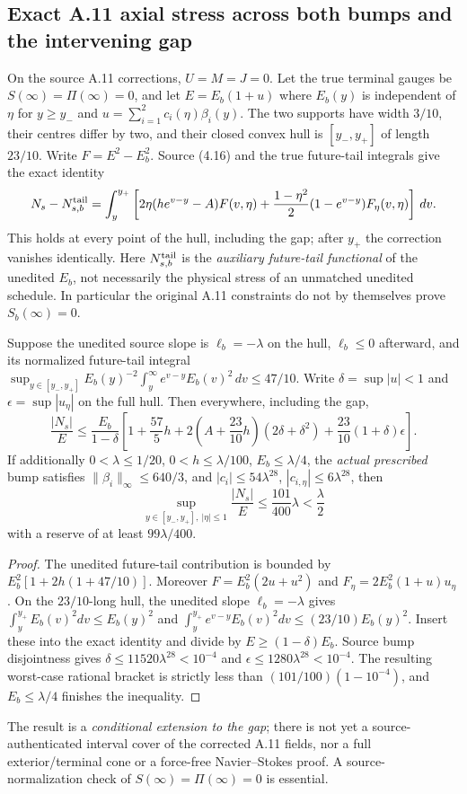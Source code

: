 \subsection*{Exact A.11 axial stress across both bumps and the intervening gap}
\label{subsec:a11-full-hull-20261021}
On the source A.11 corrections, $U=M=J=0$. Let the true terminal
gauges be $S(\infty)=\Pi(\infty)=0$, and let
$E=E_b(1+u)$ where $E_b(y)$ is independent of $\eta$ for
$y\ge y_-$ and $u=\sum_{i=1}^2c_i(\eta)\beta_i(y)$.
The two supports have width $3/10$, their centres differ by
two, and their closed convex hull is $[y_-,y_+]$ of length $23/10$.
Write $F=E^2-E_b^2$. Source (4.16) and the true future-tail
integrals give the exact identity
\[
N_s-N_{s,b}^{\rm tail}
=\int_y^{y_+}\left[
 2\eta(he^{v-y}-A)F(v,\eta)
 +\frac{1-\eta^2}{2}(1-e^{v-y})F_\eta(v,\eta)
\right]\,dv .
\]
This holds at every point of the hull, including the gap; after
$y_+$ the correction vanishes identically. Here $N_{s,b}^{\rm tail}$
is the \emph{auxiliary future-tail functional} of the unedited
$E_b$, not necessarily the physical stress of an unmatched
unedited schedule. In particular the original A.11 constraints
do not by themselves prove $S_b(\infty)=0$.

\begin{proposition}
\label{prop:a11-full-hull-20261021}
Suppose the unedited source slope is $\ell_b=-\lambda$ on the
hull, $\ell_b\le0$ afterward, and its normalized future-tail
integral $\sup_{y\in[y_-,y_+]}E_b(y)^{-2}
\int_y^\infty e^{v-y}E_b(v)^2\,dv\le47/10$.
Write $\delta=\sup|u|<1$ and $\epsilon=\sup|u_\eta|$ on the
full hull. Then everywhere, including the gap,
\[
\frac{|N_s|}{E}\le\frac{E_b}{1-\delta}
\left[1+\frac{57}{5}h+
2\left(A+\frac{23}{10}h\right)(2\delta+\delta^2)
+\frac{23}{10}(1+\delta)\epsilon\right].
\]
If additionally $0<\lambda\le1/20$, $0<h\le\lambda/100$,
$E_b\le\lambda/4$, the \emph{actual prescribed} bump
satisfies $\|\beta_i\|_\infty\le640/3$, and
$|c_i|\le54\lambda^{28}$, $|c_{i,\eta}|\le6\lambda^{28}$,
then
\[
\sup_{y\in[y_-,y_+],\ |\eta|\le1}\frac{|N_s|}{E}
\le\frac{101}{400}\lambda<\frac{\lambda}{2}
\]
with a reserve of at least $99\lambda/400$.
\end{proposition}
\begin{proof}
The unedited future-tail contribution is bounded by
$E_b^2[1+2h(1+47/10)]$. Moreover
$F=E_b^2(2u+u^2)$ and
$F_\eta=2E_b^2(1+u)u_\eta$.
On the $23/10$-long hull, the unedited slope
$\ell_b=-\lambda$ gives
$\int_y^{y_+}E_b(v)^2dv\le E_b(y)^2$ and
$\int_y^{y_+}e^{v-y}E_b(v)^2dv\le(23/10)E_b(y)^2$.
Insert these into the exact identity and divide by
$E\ge(1-\delta)E_b$. Source bump disjointness gives
$\delta\le11520\lambda^{28}<10^{-4}$ and
$\epsilon\le1280\lambda^{28}<10^{-4}$.
The resulting worst-case rational bracket is strictly
less than $(101/100)(1-10^{-4})$, and $E_b\le\lambda/4$
finishes the inequality.
\end{proof}
The result is a \emph{conditional extension to the gap};
there is not yet a source-authenticated interval cover of the
corrected A.11 fields, nor a full exterior/terminal cone or a
force-free Navier--Stokes proof. A source-normalization check of
$S(\infty)=\Pi(\infty)=0$ is essential.
